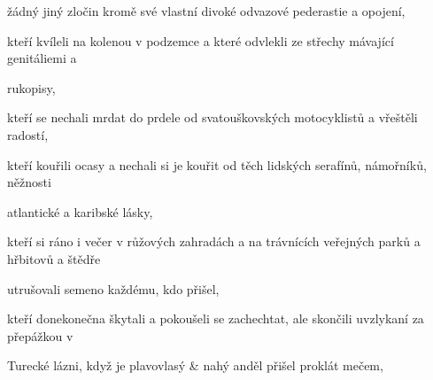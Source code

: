 \documentclass[11pt]{article}
\begin{document}
\begin{center}
žádný jiný zločin kromě své vlastní divoké odvazové pederastie a opojení,

kteří kvíleli na kolenou v podzemce a které odvlekli ze střechy mávající genitáliemi a

rukopisy,

kteří se nechali mrdat do prdele od svatouškovských motocyklistů a vřeštěli radostí,

kteří kouřili ocasy a nechali si je kouřit od těch lidských serafínů, námořníků, něžnosti

atlantické a karibské lásky,

kteří si ráno i večer v růžových zahradách a na trávnících veřejných parků a hřbitovů a štědře

utrušovali semeno každému, kdo přišel,

kteří donekonečna škytali a pokoušeli se zachechtat, ale skončili uvzlykaní za přepážkou v

Turecké lázni, když je plavovlasý \& nahý anděl přišel proklát mečem,
    \end{center}
\end{document}
